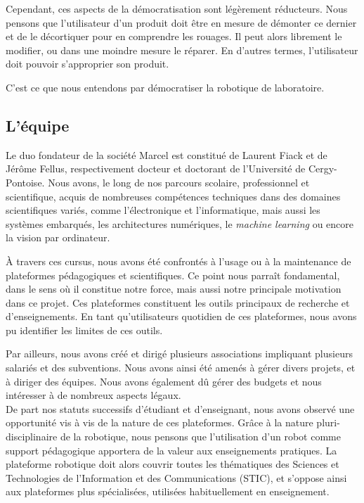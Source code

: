 \documentclass[a4paper,12pt]{report}
\begin{document}
Cependant, ces aspects de la démocratisation sont légèrement réducteurs.
Nous pensons que l'utilisateur d'un produit doit être en mesure de démonter ce dernier et de le décortiquer pour en comprendre les rouages.
Il peut alors librement le modifier, ou dans une moindre mesure le réparer.
En d'autres termes, l'utilisateur doit pouvoir s'approprier son produit.

C'est ce que nous entendons par \og{}démocratiser la robotique de laboratoire\fg{}.

\subsection{L'équipe}
Le duo fondateur de la société Marcel est constitué de Laurent Fiack et de Jérôme Fellus, respectivement docteur et doctorant de l'Université de Cergy-Pontoise.
Nous avons, le long de nos parcours scolaire, professionnel et scientifique, acquis de nombreuses compétences techniques dans des domaines scientifiques variés,
comme l'électronique et l'informatique, mais aussi les systèmes embarqués, les architectures numériques, le \emph{machine learning} ou encore la vision par ordinateur.

À travers ces cursus, nous avons été confrontés à l'usage ou à la maintenance de plateformes pédagogiques et scientifiques.
Ce point nous parraît fondamental, dans le sens où il constitue notre force, mais aussi notre principale motivation dans ce projet.
Ces plateformes constituent les outils principaux de recherche et d'enseignements.
En tant qu'utilisateurs quotidien de ces plateformes, nous avons pu identifier les limites de ces outils.

Par ailleurs, nous avons créé et dirigé plusieurs associations impliquant plusieurs salariés et des subventions.
Nous avons ainsi été amenés à gérer divers projets, et à diriger des équipes.
Nous avons également dû gérer des budgets et nous intéresser à de nombreux aspects légaux.\\

De part nos statuts successifs d'étudiant et d'enseignant, nous avons observé une opportunité vis à vis de la nature de ces plateformes.
Grâce à la nature pluri-disciplinaire de la robotique, nous pensons que l'utilisation d'un robot comme support pédagogique apportera de la valeur aux enseignements pratiques.
La plateforme robotique doit alors couvrir toutes les thématiques des Sciences et Technologies de l'Information et des Communications (STIC),
et s'oppose ainsi aux plateformes plus spécialisées, utilisées habituellement en enseignement.\\
\end{document}
